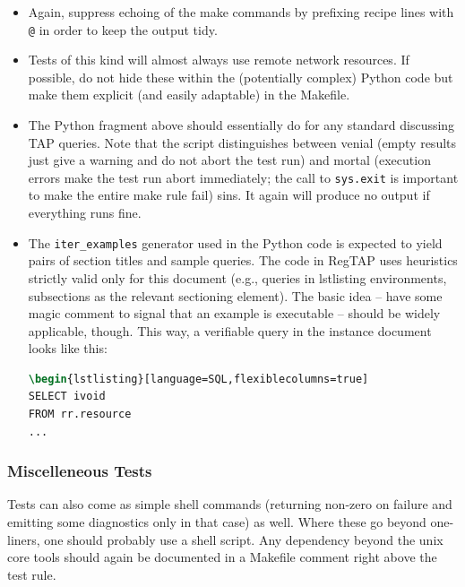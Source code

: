 \documentclass[11pt,a4paper]{ivoa}
\begin{document}
\begin{itemize}
\item Again, suppress echoing of the make commands by prefixing recipe
lines with \verb|@| in order to keep the output tidy.

\item Tests of this kind will almost always use remote network
resources.  If possible, do not hide these within the (potentially
complex) Python code but make them explicit (and easily adaptable) in
the Makefile.

\item The Python fragment above should essentially do for any standard
discussing TAP queries. Note that the script distinguishes between
venial (empty results just give a warning and do not abort the
test run) and mortal (execution errors make the test run abort
immediately; the call to \verb|sys.exit| is important to make the entire
make rule fail) sins. It again will produce no output if everything runs
fine.

\item The \verb|iter_examples| generator used in the Python code is expected
to yield pairs of section titles and sample queries.  The code in RegTAP
uses heuristics strictly valid only for this document (e.g., queries in
lstlisting environments, subsections as the relevant sectioning
element).  The basic idea -- have some magic comment to signal that an
example is executable -- should be widely applicable, though.  
This way, a verifiable query in the instance document looks like
this:
\begin{lstlisting}[language=tex,basicstyle=\footnotesize]
%CHECK_HERE
\begin{lstlisting}[language=SQL,flexiblecolumns=true]
SELECT ivoid 
FROM rr.resource
...
\end{lstlisting}

\end{itemize}

\subsubsection{Miscelleneous Tests}

Tests can also come as simple shell commands (returning non-zero on
failure and emitting some diagnostics only in that case) as well.  Where
these go beyond one-liners, one should probably use a shell script.
Any dependency beyond the unix core tools should again be documented in
a Makefile comment right above the test rule.
\end{document}
